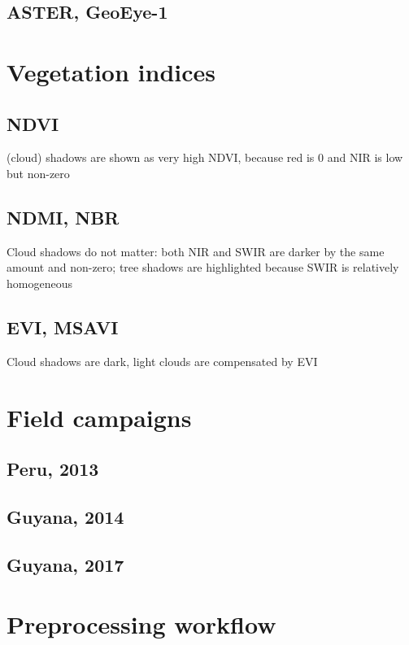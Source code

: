 \documentclass[a4paper,12pt]{scrbook}
\begin{document}
\subsection{ASTER, GeoEye-1}

\section{Vegetation indices}

\subsection{NDVI}

(cloud) shadows are shown as very high \ac{NDVI}, because red is 0 and \ac{NIR} is low but non-zero

\subsection{NDMI, NBR}

Cloud shadows do not matter: both \ac{NIR} and \ac{SWIR} are darker by the same amount and non-zero; tree shadows are highlighted because SWIR is relatively homogeneous

\subsection{EVI, MSAVI}

Cloud shadows are dark, light clouds are compensated by \ac{EVI}

\section{Field campaigns}

\subsection{Peru, 2013}

\subsection{Guyana, 2014}

\subsection{Guyana, 2017}

\section{Preprocessing workflow}
\end{document}
